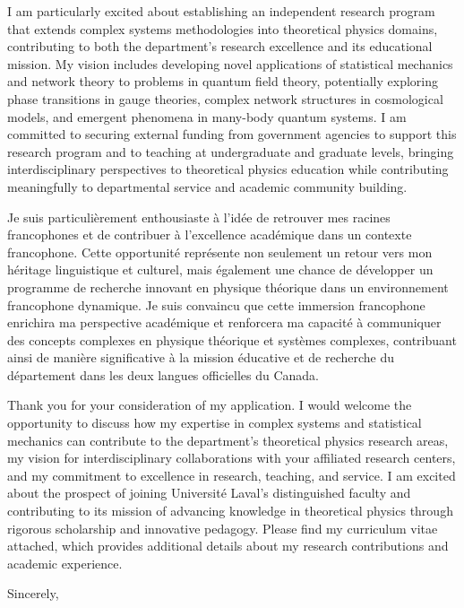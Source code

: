 \hspace{1.5em} I am particularly excited about establishing an independent research program that extends complex systems methodologies into theoretical physics domains, contributing to both the department's research excellence and its educational mission. My vision includes developing novel applications of statistical mechanics and network theory to problems in quantum field theory, potentially exploring phase transitions in gauge theories, complex network structures in cosmological models, and emergent phenomena in many-body quantum systems. I am committed to securing external funding from government agencies to support this research program and to teaching at undergraduate and graduate levels, bringing interdisciplinary perspectives to theoretical physics education while contributing meaningfully to departmental service and academic community building.
\vspace{1.0em}

\hspace{1.5em} Je suis particulièrement enthousiaste à l'idée de retrouver mes racines francophones et de contribuer à l'excellence académique dans un contexte francophone. Cette opportunité représente non seulement un retour vers mon héritage linguistique et culturel, mais également une chance de développer un programme de recherche innovant en physique théorique dans un environnement francophone dynamique. Je suis convaincu que cette immersion francophone enrichira ma perspective académique et renforcera ma capacité à communiquer des concepts complexes en physique théorique et systèmes complexes, contribuant ainsi de manière significative à la mission éducative et de recherche du département dans les deux langues officielles du Canada.
\vspace{1.0em}

\hspace{1.5em} Thank you for your consideration of my application. I would welcome the opportunity to discuss how my expertise in complex systems and statistical mechanics can contribute to the department's theoretical physics research areas, my vision for interdisciplinary collaborations with your affiliated research centers, and my commitment to excellence in research, teaching, and service. I am excited about the prospect of joining Université Laval's distinguished faculty and contributing to its mission of advancing knowledge in theoretical physics through rigorous scholarship and innovative pedagogy. Please find my curriculum vitae attached, which provides additional details about my research contributions and academic experience.
\vspace{1.0em}

Sincerely,\\
\myName\\[1.0em]

